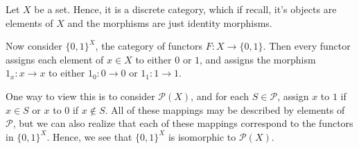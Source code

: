     \begin{example}
        Let $X$ be a set. Hence, it is a discrete category,
        which if recall, it's objects are elements of $X$ and the
        morphisms are just identity morphisms. 

        Now consider $\{0, 1\}^X$, the category of functors $F: X \to
        \{0, 1\}$. Then every functor assigns each element of $x \in
        X$ to either $0$ or $1$, and assigns the morphism $1_x: x \to
        x$ to either $1_0: 0\to 0$ or $1_1: 1 \to 1$. 

        One way to view this is to consider $\mathcal{P}(X)$, and for
        each $S \in \mathcal{P}$, assign $x$ to $1$ if $x \in  S$ or
        $x$ to $0$ if $x \not\in S$. All of these mappings may be
        described by elements of $\mathcal{P}$, but we can also
        realize that each 
        of these mappings correspond to the functors in $\{0, 1\}^X$.
        Hence, we see that $\{0, 1\}^X$ is isomorphic to
        $\mathcal{P}(X)$. 
    \end{example}

